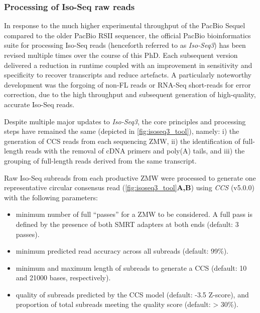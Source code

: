\clearpage
\subsubsection{Processing of Iso-Seq raw reads}
\label{section: Isoseq_rawprocessing}
In response to the much higher experimental throughput of the PacBio Sequel compared to the older PacBio RSII sequencer, the official PacBio bioinformatics suite for processing Iso-Seq reads (henceforth referred to as \textit{Iso-Seq3}) has been revised multiple times over the course of this PhD. Each subsequent version delivered a reduction in runtime coupled with an improvement in sensitivity and specificity to recover transcripts and reduce artefacts. A particularly noteworthy development was the forgoing of non-FL reads or RNA-Seq short-reads for error correction, due to the high throughput and subsequent generation of high-quality, accurate Iso-Seq reads. 

Despite multiple major updates to \textit{Iso-Seq3}, the core principles and processing steps have remained the same (depicted in \cref{fig:isoseq3_tool}), namely: i) the generation of CCS reads from each sequencing ZMW, ii) the identification of full-length reads with the removal of cDNA primers and poly(A) tails, and iii) the grouping of full-length reads derived from the same transcript. 

Raw Iso-Seq subreads from each productive ZMW were processed to generate one representative circular consensus read (\cref{fig:isoseq3_tool}\textbf{A,B}) using \textit{CCS} (v5.0.0) with the following parameters: 
\begin{itemize}
	\item minimum number of full “passes” for a ZMW to be considered. A full pass is defined by the presence of both SMRT adapters at both ends (default: 3 passes).
	\item minimum predicted read accuracy across all subreads (default: 99\%).
	\item minimum and maximum length of subreads to generate a CCS (default: 10 and 21000 bases, respectively).
	\item quality of subreads predicted by the CCS model (default: -3.5 Z-score), and proportion of total subreads meeting the quality score (default: > 30\%).
\end{itemize}


